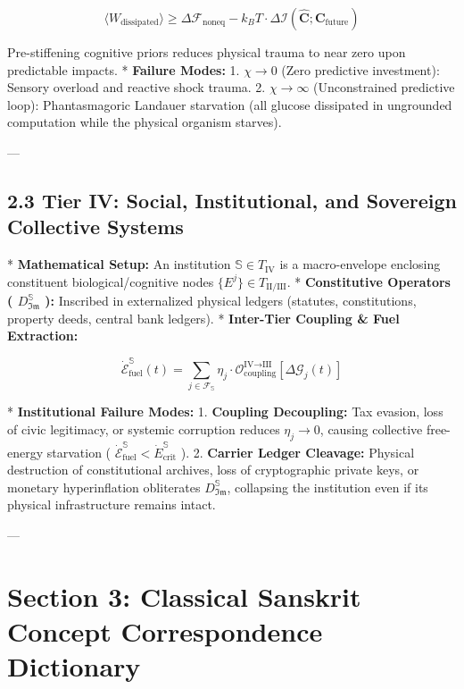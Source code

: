 \documentclass[11pt,a4paper]{article}
\theoremstyle{definition}
\theoremstyle{remark}
\begin{document}
\begin{equation}
\langle W_{\text{dissipated}} \rangle \ge \Delta \mathcal{F}_{\text{noneq}} - k_B T \cdot \Delta \mathcal{I}(\hat{\mathbf{C}}; \mathbf{C}_{\text{future}})
\end{equation}


Pre-stiffening cognitive priors reduces physical trauma to near zero upon predictable impacts.
* \textbf{Failure Modes:}
1. $\chi \to 0$ (Zero predictive investment): Sensory overload and reactive shock trauma.
2. $\chi \to \infty$ (Unconstrained predictive loop): Phantasmagoric Landauer starvation (all glucose dissipated in ungrounded computation while the physical organism starves).

---

\subsection{2.3 Tier IV: Social, Institutional, and Sovereign Collective Systems}
* \textbf{Mathematical Setup:} An institution $\mathbb{S} \in T_{\text{IV}}$ is a macro-envelope enclosing constituent biological/cognitive nodes $\{E^j\} \in T_{\text{II/III}}$.
* \textbf{Constitutive Operators ( $D_{\mathfrak{Im}}^{\mathbb{S}}$ ):} Inscribed in externalized physical ledgers (statutes, constitutions, property deeds, central bank ledgers).
* \textbf{Inter-Tier Coupling \& Fuel Extraction:}


\begin{equation}
\dot{\mathcal{E}}_{\text{fuel}}^{\mathbb{S}}(t) = \sum_{j \in \mathcal{F}_{\mathbb{S}}} \eta_j \cdot \mathcal{O}_{\text{coupling}}^{\text{IV} \to \text{III}}[ \Delta \mathcal{G}_j(t) ]
\end{equation}


* \textbf{Institutional Failure Modes:}
1. \textbf{Coupling Decoupling:} Tax evasion, loss of civic legitimacy, or systemic corruption reduces $\eta_j \to 0$, causing collective free-energy starvation ( $\dot{\mathcal{E}}_{\text{fuel}}^{\mathbb{S}} < \dot{E}_{\text{crit}}^{\mathbb{S}}$ ).
2. \textbf{Carrier Ledger Cleavage:} Physical destruction of constitutional archives, loss of cryptographic private keys, or monetary hyperinflation obliterates $D_{\mathfrak{Im}}^{\mathbb{S}}$, collapsing the institution even if its physical infrastructure remains intact.

---

\section{Section 3: Classical Sanskrit Concept Correspondence Dictionary}
\end{document}
